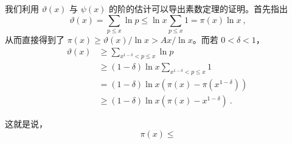 
我们利用 $\vartheta(x)$ 与 $\psi(x)$ 的阶的估计可以导出素数定理的证明。首先指出
\begin{equation}
\vartheta(x) = \sum_{p \le x} \ln p \le \ln x \sum_{p \le x} 1 = \pi(x) \ln x ~,
\end{equation}
从而直接得到了 $\pi(x) \ge \vartheta(x)/\ln x > Ax / \ln x$。而若 $0 < \delta < 1$，
\begin{equation}
\begin{aligned}
\vartheta(x) &\ge \sum_{x^{1-\delta} < p \le x} \ln p ~\\
&\ge (1-\delta) \ln x \sum_{x^{1-\delta} < p \le x} 1 ~\\
&= (1-\delta) \ln x \left( \pi(x) - \pi(x^{1-\delta}) \right) ~\\
&\ge (1-\delta) \ln x \left( \pi(x) - x^{1-\delta} \right) ~.
\end{aligned}
\end{equation}

这就是说，
\begin{equation}
\pi(x) \le 
\end{equation}

